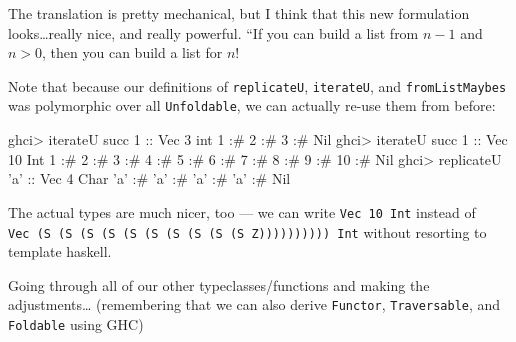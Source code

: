 \documentclass[]{article}
\newenvironment{Shaded}{}{}
\newcommand{\DataTypeTok}[1]{\textcolor[rgb]{0.56,0.13,0.00}{{#1}}}
\newcommand{\DecValTok}[1]{\textcolor[rgb]{0.25,0.63,0.44}{{#1}}}
\newcommand{\CharTok}[1]{\textcolor[rgb]{0.25,0.44,0.63}{{#1}}}
\newcommand{\OtherTok}[1]{\textcolor[rgb]{0.00,0.44,0.13}{{#1}}}
\newcommand{\FunctionTok}[1]{\textcolor[rgb]{0.02,0.16,0.49}{{#1}}}
\newcommand{\NormalTok}[1]{{#1}}
\begin{document}
The translation is pretty mechanical, but I think that this new formulation
looks\ldots{}really nice, and really powerful. ``If you can build a list from
\(n - 1\) and \(n > 0\), then you can build a list for \(n\)!

Note that because our definitions of \texttt{replicateU}, \texttt{iterateU}, and
\texttt{fromListMaybes} was polymorphic over all \texttt{Unfoldable}, we can
actually re-use them from before:

\begin{Shaded}
\begin{Highlighting}[]
\NormalTok{ghci}\FunctionTok{>} \NormalTok{iterateU succ }\DecValTok{1}\OtherTok{ ::} \DataTypeTok{Vec} \DecValTok{3} \NormalTok{int}
\DecValTok{1} \FunctionTok{:#} \DecValTok{2} \FunctionTok{:#} \DecValTok{3} \FunctionTok{:#} \DataTypeTok{Nil}
\NormalTok{ghci}\FunctionTok{>} \NormalTok{iterateU succ }\DecValTok{1}\OtherTok{ ::} \DataTypeTok{Vec} \DecValTok{10} \DataTypeTok{Int}
\DecValTok{1} \FunctionTok{:#} \DecValTok{2} \FunctionTok{:#} \DecValTok{3} \FunctionTok{:#} \DecValTok{4} \FunctionTok{:#} \DecValTok{5} \FunctionTok{:#} \DecValTok{6} \FunctionTok{:#} \DecValTok{7} \FunctionTok{:#} \DecValTok{8} \FunctionTok{:#} \DecValTok{9} \FunctionTok{:#} \DecValTok{10} \FunctionTok{:#} \DataTypeTok{Nil}
\NormalTok{ghci}\FunctionTok{>} \NormalTok{replicateU }\CharTok{'a'}\OtherTok{ ::} \DataTypeTok{Vec} \DecValTok{4} \DataTypeTok{Char}
\CharTok{'a'} \FunctionTok{:#} \CharTok{'a'} \FunctionTok{:#} \CharTok{'a'} \FunctionTok{:#} \CharTok{'a'} \FunctionTok{:#} \DataTypeTok{Nil}
\end{Highlighting}
\end{Shaded}

The actual types are much nicer, too --- we can write \texttt{Vec\ 10\ Int}
instead of
\texttt{Vec\ (S\ (S\ (S\ (S\ (S\ (S\ (S\ (S\ (S\ (S\ Z))))))))))\ Int} without
resorting to template haskell.

Going through all of our other typeclasses/functions and making the
adjustments\ldots{} (remembering that we can also derive \texttt{Functor},
\texttt{Traversable}, and \texttt{Foldable} using GHC)
\end{document}
